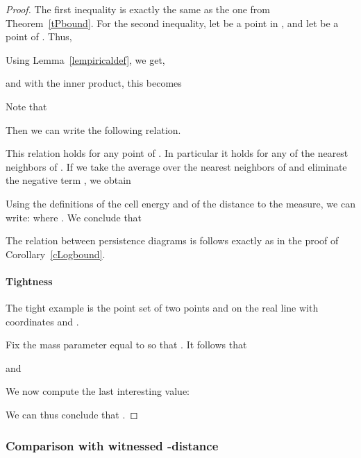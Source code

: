 \documentclass[a4paper]{article}
\begin{document}
\begin{proof}
The first inequality is exactly the same as the one from Theorem~\ref{tPbound}.
For the second inequality, let  be a point in , and let  be a point of .
Thus,


Using Lemma~\ref{lempiricaldef}, we get, 

and with the inner product, this becomes

Note that 

Then we can write the following relation. 


This relation holds for any point of . 
In particular it holds for any of the  nearest neighbors of . 
If we take the average over the  nearest neighbors of  and eliminate the negative term , we obtain


Using the definitions of the cell energy and of the distance to the measure, we can write: 
where .
We conclude that 


The relation between persistence diagrams is follows exactly as in the proof of Corollary~\ref{cLogbound}.

\paragraph{Tightness\\}
The tight example is the point set  of two points  and  on the real line with coordinates  and .
\begin{center}
\end{center}

Fix the mass parameter  equal to  so that . 
It follows that

and


We now compute the last interesting value:

We can thus conclude that .
\end{proof}

\subsubsection{Comparison with witnessed -distance}\label{ssCompWkd}
\end{document}

